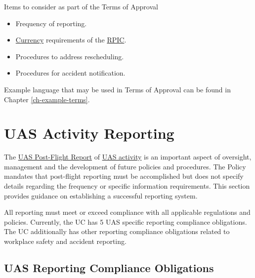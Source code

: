 \documentclass[
]{book}
\providecommand{\tightlist}{%
  \setlength{\itemsep}{0pt}\setlength{\parskip}{0pt}}
\begin{document}
Items to consider as part of the Terms of Approval

\begin{itemize}
\tightlist
\item
  Frequency of reporting.
\item
  \protect\hyperlink{currency}{Currency} requirements of the \protect\hyperlink{RPIC}{RPIC}.
\item
  Procedures to address rescheduling.
\item
  Procedures for accident notification.
\end{itemize}

Example language that may be used in Terms of Approval can be found in Chapter \ref{ch-example-terms}.

\hypertarget{ch-reporting}{%
\chapter{UAS Activity Reporting}\label{ch-reporting}}

The \protect\hyperlink{postflight}{UAS Post-Flight Report} of \protect\hyperlink{UASactivity}{UAS activity} is an important aspect of oversight, management and the development of future policies and procedures. The Policy mandates that post-flight reporting must be accomplished but does not specify details regarding the frequency or specific information requirements. This section provides guidance on establishing a successful reporting system.

All reporting must meet or exceed compliance with all applicable regulations and policies. Currently, the UC has 5 UAS specific reporting compliance obligations. The UC additionally has other reporting compliance obligations related to workplace safety and accident reporting.

\hypertarget{s-reporting-compliance}{%
\section{UAS Reporting Compliance Obligations}\label{s-reporting-compliance}}
\end{document}
